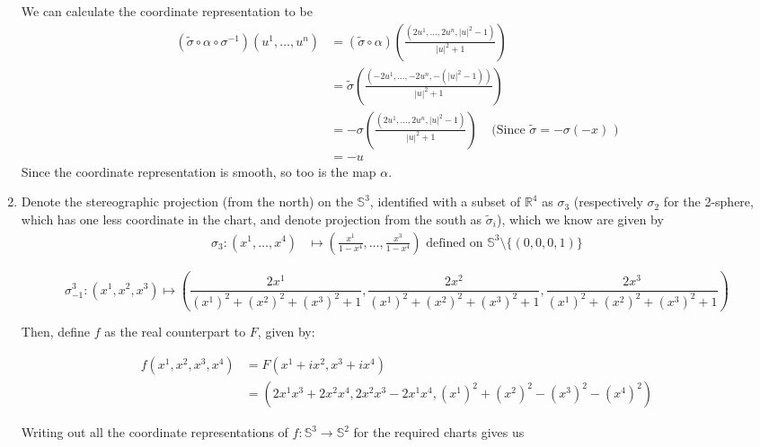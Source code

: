 \documentclass{article}
\newcommand{\R}{\mathbb{R}}
\begin{document}
\begin{enumerate}[label=(\alph*)]
  We can calculate the coordinate representation to be 
  \begin{align*}
  (\tilde{\sigma} \circ \alpha \circ \sigma^{-1})(u^1, \dots, u^n) &= \left( \tilde{\sigma} \circ \alpha \right)\left( \frac{(2u^1, \dots, 2u^n, \left| u \right|^2 - 1)}{\left| u \right|^2 + 1} \right)\\
  &= \tilde{\sigma} \left( \frac{(-2u^1, \dots, -2u^n, -(\left| u \right|^2 - 1))}{\left| u \right|^2 + 1}  \right) \\
  &= - \sigma \left( \frac{(2u^1, \dots, 2u^n, \left| u \right|^2 - 1)}{\left| u \right|^2 + 1}  \right)  \;\;\;\; \text{(Since $\tilde{\sigma} = - \sigma(-x)$ )} \\
  &= -u
  \end{align*}
  Since the coordinate representation is smooth, so too is the map $\alpha$.
  
  \vskip 0.5cm
  \item  Denote the stereographic projection (from the north) on the $\mathbb{S}^3$, identified with a subset of $\R^4$ as $\sigma_3$ (respectively $\sigma_2$ for the 2-sphere, which has one less coordinate in the chart, and denote projection from the south as $\tilde{\sigma}_i$), which we know are given by 
  \begin{align*}
    \sigma_3: (x^1, \ldots, x^4) &\mapsto \left( \frac{x^1}{1-x^4}, \ldots, \frac{x^3}{1-x^4} \right) \text{ defined on } \mathbb{S}^3 \setminus \{(0, 0, 0, 1)\} 
  \end{align*}

  \[ \sigma_{-1}^3: (x^1, x^2, x^3) \mapsto \left( \frac{2x^1}{(x^1)^2 + (x^2)^2 + (x^3)^2 + 1}, \frac{2x^2}{(x^1)^2 + (x^2)^2 + (x^3)^2 + 1}, \frac{2x^3}{(x^1)^2 + (x^2)^2 + (x^3)^2 + 1} \right)  \]
  
  Then, define $f$ as the real counterpart to $F$, given by:
  
  \begin{align*}
    f(x^1, x^2, x^3, x^4) &= F(x^1 + ix^2, x^3 + ix^4) \\
    &= ( 2x^1x^3 + 2x^2x^4, 2x^2x^3 - 2x^1x^4, (x^1)^2 + (x^2)^2 - (x^3)^2 - (x^4)^2 )
  \end{align*}
  
  
  Writing out all the coordinate representations of $f: \mathbb{S}^{3} \to \mathbb{S}^{2}$ for the required charts gives us
  

\end{enumerate}
\end{document}
